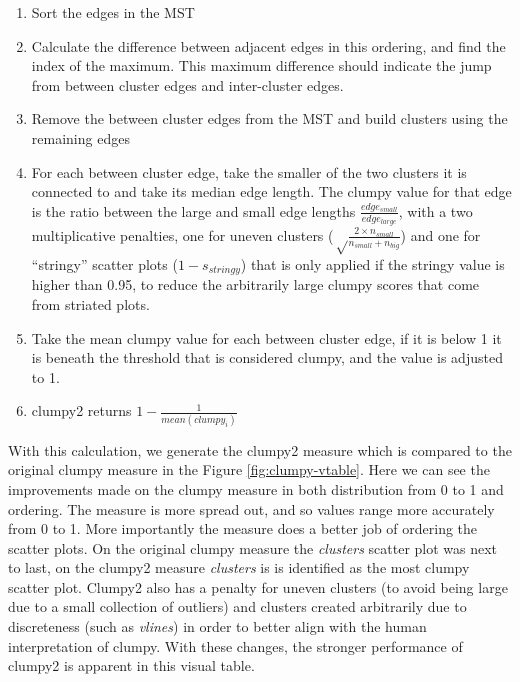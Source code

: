 \begin{enumerate}
\def\labelenumi{\arabic{enumi}.}
\tightlist
\item
  Sort the edges in the MST
\item
  Calculate the difference between adjacent edges in this ordering, and
  find the index of the maximum. This maximum difference should indicate
  the jump from between cluster edges and inter-cluster edges.
\item
  Remove the between cluster edges from the MST and build clusters using
  the remaining edges
\item
  For each between cluster edge, take the smaller of the two clusters it
  is connected to and take its median edge length. The clumpy value for
  that edge is the ratio between the large and small edge lengths
  \(\frac{edge_{small}}{edge_{large}}\), with a two multiplicative
  penalties, one for uneven clusters
  (\(\sqrt\frac{2\times n_{small}}{n_{small}+n_{big}}\)) and one for
  ``stringy'' scatter plots (\(1-s_{stringy}\)) that is only applied if
  the stringy value is higher than 0.95, to reduce the arbitrarily large
  clumpy scores that come from striated plots.
\item
  Take the mean clumpy value for each between cluster edge, if it is
  below 1 it is beneath the threshold that is considered clumpy, and the
  value is adjusted to 1.
\item
  clumpy2 returns \(1-\frac{1}{mean(clumpy_i)}\)
\end{enumerate}

With this calculation, we generate the clumpy2 measure which is compared
to the original clumpy measure in the Figure \ref{fig:clumpy-vtable}.
Here we can see the improvements made on the clumpy measure in both
distribution from 0 to 1 and ordering. The measure is more spread out,
and so values range more accurately from 0 to 1. More importantly the
measure does a better job of ordering the scatter plots. On the original
clumpy measure the \emph{clusters} scatter plot was next to last, on the
clumpy2 measure \emph{clusters} is is identified as the most clumpy
scatter plot. Clumpy2 also has a penalty for uneven clusters (to avoid
being large due to a small collection of outliers) and clusters created
arbitrarily due to discreteness (such as \emph{vlines}) in order to
better align with the human interpretation of clumpy. With these
changes, the stronger performance of clumpy2 is apparent in this visual
table.

